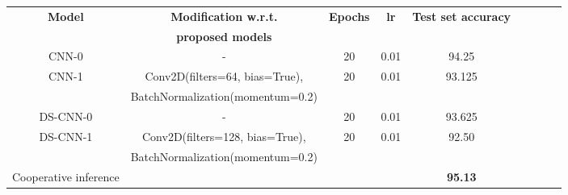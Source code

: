 \documentclass{article}
\begin{document}
\vspace{0.2cm}

\begin{center}
\begin{tabular}{ |c|c|c|c|c|c|c|c|c| } 
\hline
\vspace{-0.09cm}

\textbf{Model} &\textbf{Modification w.r.t.} &\textbf{Epochs}&\textbf{lr} &\textbf{Test set accuracy}\\
\textbf{} &\textbf{proposed models} &\textbf{}&\textbf{} &\textbf{}\\
\hline
CNN-0 &-& 20 & 0.01 & 94.25\\
\hline
CNN-1&Conv2D(filters=64, bias=True),&20&0.01&93.125\\
&BatchNormalization(momentum=0.2)&&&\\
\hline
DS-CNN-0&-&20&0.01&93.625\\
\hline
DS-CNN-1&Conv2D(filters=128, bias=True),&20&0.01&92.50\\
& BatchNormalization(momentum=0.2)&&&\\
\hline\hline
Cooperative inference &&&&\textbf{95.13} \\
\hline
\end{tabular}

\end{center}
\end{document}
